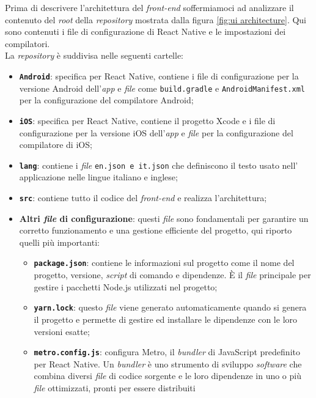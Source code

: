 Prima di descrivere l'architettura del \textit{front-end} soffermiamoci ad analizzare il contenuto del \textit{root} della \textit{repository} 
mostrata dalla figura \ref{fig:ui architecture}.
Qui sono contenuti i file di configurazione di React Native e le impostazioni dei compilatori.\\
La \textit{repository} è suddivisa nelle seguenti cartelle:
\begin{itemize}
    \item \texttt{\textbf{Android}}: specifica per React Native, contiene i file di configurazione 
          per la versione Android dell'\textit{app} e \textit{file} come \texttt{build.gradle} e \texttt{AndroidManifest.xml} 
          per la configurazione del compilatore Android;
    \item \texttt{\textbf{iOS}}: specifica per React Native, contiene il progetto Xcode e i file di configurazione 
          per la versione iOS dell'\textit{app} e \textit{file} per la configurazione del compilatore di iOS;
    \item \texttt{\textbf{lang}}: contiene i \textit{file} \texttt{en.json e it.json} che definiscono il testo usato nell'
          applicazione nelle lingue italiano e inglese;
    \item \texttt{\textbf{src}}: contiene tutto il codice del \textit{front-end} e realizza l'architettura;
    \item \textbf{Altri \textit{file} di configurazione}: questi \textit{file} sono fondamentali 
          per garantire un corretto funzionamento e una gestione efficiente del progetto, qui riporto quelli più importanti:
          \begin{itemize}
            \item \textbf{\texttt{package.json}}: contiene le informazioni sul progetto come il nome del progetto, versione,
                  \textit{script} di comando e dipendenze. È il \textit{file} principale per gestire i pacchetti Node.js utilizzati nel progetto;
            \item \textbf{\texttt{yarn.lock}}: questo \textit{file} viene generato automaticamente quando si genera il progetto e 
                  permette di gestire ed installare le dipendenze con le loro versioni esatte;
            \item \textbf{\texttt{metro.config.js}}: configura Metro, il \textit{bundler} di JavaScript predefinito 
                  per React Native. Un \textit{bundler} è uno strumento di sviluppo \textit{software} che combina diversi 
                  \textit{file} di codice sorgente e le loro dipendenze in uno o più \textit{file} ottimizzati, pronti per essere distribuiti 

\end{itemize}
\end{itemize}
